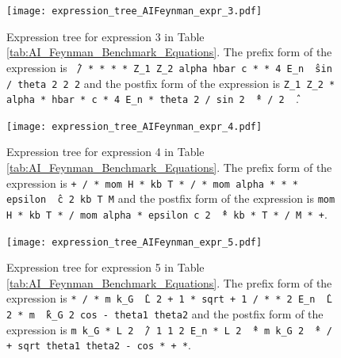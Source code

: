 \documentclass[12pt]{iopart}
\begin{document}
\begin{figure}
    \centering
    \texttt{[image: expression\_tree\_AIFeynman\_expr\_3.pdf]}
    \caption{Expression tree for expression 3 in Table \ref{tab:AI_Feynman_Benchmark_Equations}. The prefix form of the expression is \texttt{\^\ / * * * * Z\_1 Z\_2 alpha hbar c * * 4 E\_n \^\ sin / theta 2 2 2} and the postfix form of the expression is \texttt{Z\_1 Z\_2 * alpha * hbar * c * 4 E\_n * theta 2 / sin 2 \^\ * / 2 \^\ }. } 
    \label{fig:expression_tree_AIFeynman_expr_3}
\end{figure}

\begin{figure}
    \centering
    \texttt{[image: expression\_tree\_AIFeynman\_expr\_4.pdf]}
    \caption{Expression tree for expression 4 in Table \ref{tab:AI_Feynman_Benchmark_Equations}.  The prefix form of the expression is \texttt{+ / * mom H * kb T * / * mom alpha * * * epsilon \^\ c 2 kb T M} and the postfix form of the expression is \texttt{mom H * kb T * / mom alpha * epsilon c 2 \^\ * kb * T * / M * +}. } 
    \label{fig:expression_tree_AIFeynman_expr_4}
\end{figure}

\begin{figure}
    \centering
    \texttt{[image: expression\_tree\_AIFeynman\_expr\_5.pdf]}
    \caption{Expression tree for expression 5 in Table \ref{tab:AI_Feynman_Benchmark_Equations}. The prefix form of the expression is \texttt{* / * m k\_G \^\ L 2 + 1 * sqrt + 1 / * * 2 E\_n \^\ L 2 * m \^\ k\_G 2 cos - theta1 theta2} and the postfix form of the expression is \texttt{m k\_G * L 2 \^\ / 1 1 2 E\_n * L 2 \^\ * m k\_G 2 \^\ * / + sqrt theta1 theta2 - cos * +  *}. } 
    \label{fig:expression_tree_AIFeynman_expr_5}
\end{figure}
\end{document}
